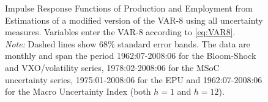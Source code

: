 \documentclass[a4paper,11pt,listof=nochaptergap,oneside,pointednumbers,bibtotoc,bigheadings,liststotoc]{scrbook}
\begin{document}
\begin{figure}[!h]
   \centering
   \setlength\fboxsep{0pt}
   \setlength\fboxrule{0pt}
      \caption[Impulse Response Functions of Production and Employment from Estimations of a modified version of the VAR-8 following \citet{bloom:09} using all uncertainty measures.]{Impulse Response Functions of Production and Employment from Estimations of a modified version of the VAR-8 \citet{bloom:09} using all uncertainty measures. Variables enter the VAR-8 according to \ref{eq:VAR8}.\\
       \textit{Note:} Dashed lines show 68\% standard error bands. The data are monthly and span the period 1962:07-2008:06 for the Bloom-Shock and VXO/volatility series, 1978:02-2008:06 for the MSoC uncertainty series, 1975:01-2008:06 for the EPU and 1962:07-2008:06 for the Macro Uncertainty Index (both $h=1$ and $h=12$).}   \label{fig:VAR8_NoHP_until2008}
\end{figure}
\end{document}

